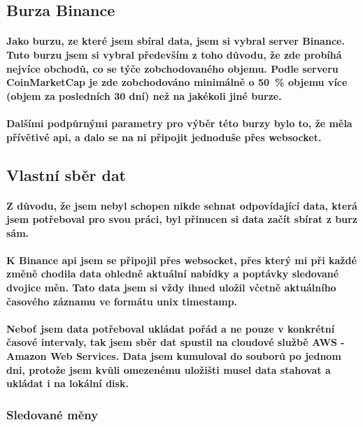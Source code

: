 \documentclass[thesis=B,czech]{FITthesis}[2019/03/21]
\begin{document}
\subsection{Burza Binance}
\paragraph{
Jako burzu, ze které jsem sbíral data, jsem si vybral server Binance. Tuto burzu jsem si vybral především z toho důvodu, že zde probíhá nejvíce obchodů, co se týče zobchodovaného objemu. Podle serveru CoinMarketCap je zde zobchodováno minimálně o 50~\% objemu více (objem za posledních 30 dní) než na jakékoli jiné burze. \cite{coinmarketcap}
}
\paragraph{
Dalšími podpůrnými parametry pro výběr této burzy bylo to, že měla přívětivé api, a dalo se na ni připojit jednoduše přes websocket. \cite{BinanceApi}
}
\subsection{Vlastní sběr dat}
\paragraph{
Z důvodu, že jsem nebyl schopen nikde sehnat odpovídající data, která jsem potřeboval pro svou práci, byl přinucen si data začít sbírat z burz sám.
}
\paragraph{
K Binance api jsem se připojil přes websocket, přes který mi při každé změně chodila data ohledně aktuální nabídky a poptávky sledované dvojice měn. Tato data jsem si vždy ihned uložil včetně aktuálního časového záznamu ve formátu unix timestamp.\cite{BinanceApi}
}
\paragraph{
Neboť jsem data potřeboval ukládat pořád a ne pouze v konkrétní časové intervaly, tak jsem sběr dat spustil na cloudové službě AWS - Amazon Web Services. Data jsem kumuloval do souborů po jednom dni, protože jsem kvůli omezenému uložišti musel data stahovat a ukládat i na lokální disk.
}
\subsubsection{Sledované měny}
\end{document}
